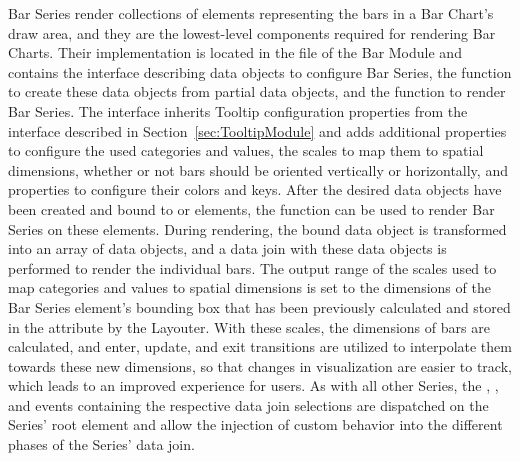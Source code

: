 Bar Series render collections of  elements representing
the bars in a Bar Chart's draw area, and they are the lowest-level
components required for rendering Bar Charts. Their implementation is
located in the  file of the Bar Module and
contains the  interface describing data objects to
configure Bar Series, the  function to create
these data objects from partial data objects, and the
 function to render Bar Series. The
 interface inherits Tooltip configuration properties
from the  interface described in
Section~\ref{sec:TooltipModule} and adds additional properties to
configure the used categories and values, the scales to map them to
spatial dimensions, whether or not bars should be oriented vertically
or horizontally, and properties to configure their colors and keys.
After the desired  data objects have been created and
bound to  or  elements, the
 function can be used to render Bar Series on
these elements. During rendering, the bound  data
object is transformed into an array of  data objects, and a
data join with these data objects is performed to render the
individual bars. The output range of the scales used to map
categories and values to spatial dimensions is set to the dimensions
of the Bar Series element's bounding box that has been previously
calculated and stored in the  attribute by the Layouter.
With these scales, the dimensions of bars are calculated, and enter,
update, and exit transitions are utilized to interpolate them towards
these new dimensions, so that changes in visualization are easier to
track, which leads to an improved experience for users. As with all
other Series, the , , and  events
containing the respective data join selections are dispatched on the
Series' root element and allow the injection of custom behavior into
the different phases of the Series' data join.

